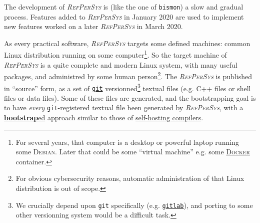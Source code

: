 \documentclass[11pt,a4paper,svgnames]{article}
\newcommand{\RefPerSys}{{\textit{\textsc{RefPerSys}}}}
\begin{document}
The development of {\RefPerSys} is (like the one of \texttt{bismon}) a
slow and gradual process. Features added to {\RefPerSys} in January
2020 are used to implement new features worked on a later {\RefPerSys}
in March 2020.

As every practical software, {\RefPerSys} targets some defined
machines: common Linux distribution running on some
computer\footnote{For several years, that computer is a desktop or
powerful laptop running some \textsc{Debian}. Later that could be some
``virtual machine'' e.g. some
\href{https://www.docker.com/}{\textsc{Docker}} container.}. So the
target machine of {\RefPerSys} is a quite complete and modern Linux
system, with many useful packages, and administred by some human
person\footnote{For obvious cybersecurity reasons, automatic
administration of that Linux distribution is out of scope.}. The
{\RefPerSys} is published in ``source'' form, as a set of
\href{http://git-scm.com/}{\texttt{git}} versionned\footnote{We
crucially depend upon \texttt{git} specifically
(e.g. \href{http://gitlab.org/}{\texttt{gitlab}}), and porting to some
other versionning system would be a difficult task.} textual files
(e.g. C++ files or shell files or data files). Some of these files are
generated, and the bootstrapping goal is to have \emph{every}
\texttt{git}-registered textual file been generated by {\RefPerSys},
with a
\href{https://en.wikipedia.org/wiki/Bootstrapping\_(compilers)}{\textbf{bootstrap}ed}
approach similar to those of
\href{https://en.wikipedia.org/wiki/Self-hosting_(compilers)}{self-hosting
  compilers}.
\medskip


\clearpage


\printbibliography
\end{document}
